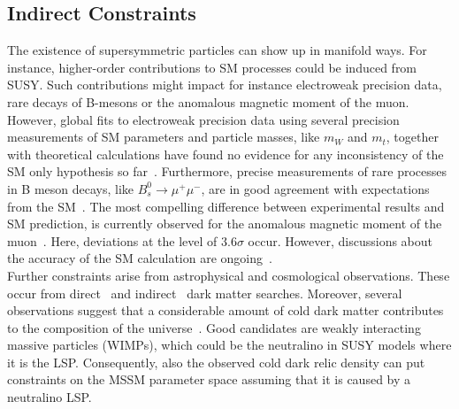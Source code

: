 \subsection{Indirect Constraints}
\label{subsec:susy_indirect}
The existence of supersymmetric particles can show up in manifold ways. For instance, higher-order contributions to SM processes could be induced from SUSY. Such contributions might impact for instance electroweak precision data, rare decays of B-mesons or the anomalous magnetic moment of the muon. However, global fits to electroweak precision data using several precision measurements of SM parameters and particle masses, like $m_W$ and $m_t$, together with theoretical calculations have found no evidence for any inconsistency of the SM only hypothesis so far~\cite{LEP-2, Erler:2012wz, Ciuchini:2013pca, Baak:2014ora}. Furthermore, precise measurements of rare processes in B meson decays, like $B_s^0 \rightarrow \mu^+ \mu^-$, are in good agreement with expectations from the SM~\cite{Chatrchyan:2013bka, Aaij:2013aka, CMS-PAS-BPH-13-007}. The most compelling difference between experimental results and SM prediction, is currently observed for the anomalous magnetic moment of the muon~\cite{Bennett:2006fi, Hagiwara:2011af, Agashe:2014kda}. Here, deviations at the level of $3.6\sigma$ occur. However, discussions about the accuracy of the SM calculation are ongoing~\cite{Davier:2010nc}. \\  
Further constraints arise from astrophysical and cosmological observations. These occur from direct~\cite{cerdeno2010direct} and indirect~\cite{Cirelli:2010xx} dark matter searches. Moreover, several observations suggest that a considerable amount of cold dark matter contributes to the composition of the universe~\cite{wmap, Ade:2013zuv}. Good candidates are weakly interacting massive particles (WIMPs), which could be the neutralino in SUSY models where it is the LSP. Consequently, also the observed cold dark relic density can put constraints on the MSSM parameter space assuming that it is caused by a neutralino LSP.      
